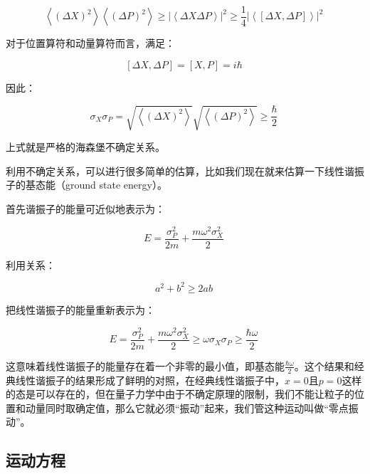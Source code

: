 \begin{equation}
\left\langle \left( \Delta X \right)^2  \right\rangle \left\langle \left( \Delta P \right)^2  \right\rangle \ge \left|  \left\langle \Delta X \Delta P \right\rangle  \right|^2 \ge \frac{1}{4} \left| { \left\langle { \left[ \Delta X, \Delta P \right] } \right\rangle } \right|^2~
\end{equation}

对于位置算符和动量算符而言，满足：

\begin{equation}
\left[ \Delta X, \Delta P \right] = \left[ X, P \right] = i \hbar~
\end{equation}

因此：

\begin{equation}
\sigma_X \sigma_P = \sqrt{ \left\langle \left( \Delta X \right)^2 \right\rangle } \sqrt{ \left\langle \left( \Delta P \right)^2  \right\rangle }  \ge \frac{\hbar}{2}~
\end{equation}

上式就是严格的海森堡不确定关系。

利用不确定关系，可以进行很多简单的估算，比如我们现在就来估算一下线性谐振子的基态能（ground state energy）。

首先谐振子的能量可近似地表示为：

\begin{equation}
E = \frac{\sigma_P^2 }{2m} + \frac{m \omega^2 \sigma_X^2}{2}~
\end{equation}

利用关系：

\begin{equation}
a^2 + b^2 \ge 2 a b~
\end{equation}

把线性谐振子的能量重新表示为：

\begin{equation}
E = \frac{\sigma_P^2 }{2m} + \frac{m \omega^2 \sigma_X^2}{2} \ge \omega \sigma_X \sigma_P \ge \frac{\hbar \omega}{2}~
\end{equation}

这意味着线性谐振子的能量存在着一个非零的最小值，即基态能$\frac{\hbar \omega}{2}$。这个结果和经典线性谐振子的结果形成了鲜明的对照，在经典线性谐振子中，$x = 0$且$p=0$这样的态是可以存在的，但在量子力学中由于不确定原理的限制，我们不能让粒子的位置和动量同时取确定值，那么它就必须“振动”起来，我们管这种运动叫做“零点振动”。

\subsection{运动方程}

